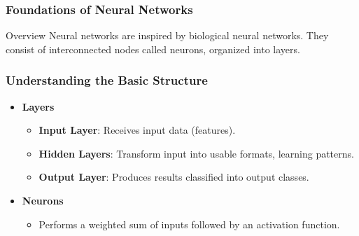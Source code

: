 \documentclass[aspectratio=169]{beamer}
\begin{document}
\begin{frame}[fragile]
    \frametitle{Foundations of Neural Networks}
    \begin{block}{Overview}
        Neural networks are inspired by biological neural networks. They consist of interconnected nodes called neurons, organized into layers.
    \end{block}
\end{frame}

\begin{frame}[fragile]
    \frametitle{Understanding the Basic Structure}
    \begin{itemize}
        \item \textbf{Layers}
            \begin{itemize}
                \item \textbf{Input Layer}: Receives input data (features).
                \item \textbf{Hidden Layers}: Transform input into usable formats, learning patterns.
                \item \textbf{Output Layer}: Produces results classified into output classes.
            \end{itemize}
        \item \textbf{Neurons}
            \begin{itemize}
                \item Performs a weighted sum of inputs followed by an activation function.
            \end{itemize}
    \end{itemize}
    \begin{center}
    \end{center}
\end{frame}
\end{document}
